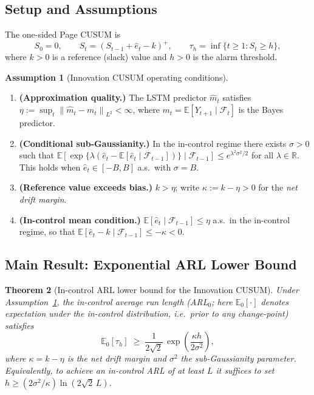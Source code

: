 \documentclass[bj,authoryear]{imsart}
\theoremstyle{plain}
\newtheorem{theorem}{Theorem}[section]
\theoremstyle{definition}
\newtheorem{assumption}[theorem]{Assumption}
\newcommand{\E}{\mathbb{E}}
\newcommand{\R}{\mathbb{R}}
\newcommand{\F}{\mathcal{F}}
\newcommand{\norm}[1]{\left\lVert #1 \right\rVert}
\newcommand{\given}{\mid}
\begin{document}
\subsection{Setup and Assumptions}

The one-sided Page CUSUM \citep{page1954continuous} is
\begin{equation}
  S_0 = 0,\qquad S_t = (S_{t-1}+\hat{e}_t-k)^+,\qquad
  \tau_h = \inf\{t\geq 1: S_t\geq h\},
  \label{eq:cusum}
\end{equation}
where $k>0$ is a reference (slack) value and $h>0$ is the alarm threshold.

\begin{assumption}[Innovation CUSUM operating conditions]
\label{ass:pathway}
  \leavevmode
  \begin{enumerate}[label=(B\arabic*), itemsep=3pt]
    \item \textbf{(Approximation quality.)}
      The LSTM predictor $\hat{m}_t$ satisfies
      $\eta:=\sup_t\norm{\hat{m}_t-m_t}_{L^2}<\infty$,
      where $m_t=\E[Y_{t+1}\given\F_t]$ is the Bayes predictor.
    \item \textbf{(Conditional sub-Gaussianity.)}
      In the in-control regime there exists $\sigma>0$ such that
      $\E[\exp\{\lambda(\hat{e}_t-\E[\hat{e}_t\given\F_{t-1}])\}
        \given\F_{t-1}]\leq e^{\lambda^2\sigma^2/2}$
      for all $\lambda\in\R$.  This holds when $\hat{e}_t\in[-B,B]$
      a.s.\ with $\sigma=B$.
    \item \textbf{(Reference value exceeds bias.)}
      $k>\eta$; write $\kappa:=k-\eta>0$ for the \emph{net drift margin}.
    \item \textbf{(In-control mean condition.)}
      $\E[\hat{e}_t\given\F_{t-1}]\leq\eta$ a.s.\ in the in-control
      regime, so that $\E[\hat{e}_t-k\given\F_{t-1}]\leq-\kappa<0$.
  \end{enumerate}
\end{assumption}

\subsection{Main Result: Exponential ARL Lower Bound}

\begin{theorem}[In-control ARL lower bound for the Innovation CUSUM]
\label{thm:arl}
  Under Assumption~\ref{ass:pathway}, the in-control average run length
  (ARL$_0$; here $\E_0[\cdot]$ denotes expectation under the in-control
  distribution, i.e.\ prior to any change-point) satisfies
  \begin{equation}
    \E_0[\tau_h]
    \;\geq\; \frac{1}{2\sqrt{2}}\,\exp\!\left(\frac{\kappa h}{2\sigma^2}\right),
    \label{eq:arl-lb}
  \end{equation}
  where $\kappa=k-\eta$ is the net drift margin and $\sigma^2$ the
  sub-Gaussianity parameter.  Equivalently, to achieve an in-control ARL
  of at least $L$ it suffices to set
  $h\geq (2\sigma^2/\kappa)\ln(2\sqrt{2}\,L)$.
\end{theorem}
\end{document}
